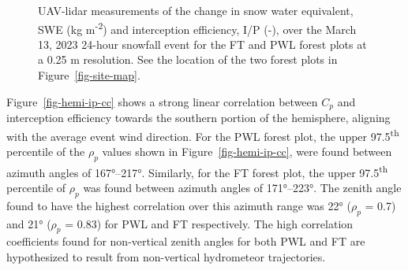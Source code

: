 \documentclass[
  letterpaper,
  DIV=11,
  numbers=noendperiod]{scrartcl}
\begin{document}
\begin{figure}[H]


\caption{\label{fig-lidar-tf-ip}UAV-lidar measurements of the change in
snow water equivalent, SWE (kg m\textsuperscript{-2}) and interception
efficiency, I/P (-), over the March 13, 2023 24-hour snowfall event for
the FT and PWL forest plots at a 0.25 m resolution. See the location of
the two forest plots in Figure~\ref{fig-site-map}.}

\end{figure}%

Figure~\ref{fig-hemi-ip-cc} shows a strong linear correlation between
\(C_p\) and interception efficiency towards the southern portion of the
hemisphere, aligning with the average event wind direction. For the PWL
forest plot, the upper 97.5\textsuperscript{th} percentile of the
\(\rho_p\) values shown in Figure~\ref{fig-hemi-ip-cc}, were found
between azimuth angles of 167°--217°. Similarly, for the FT forest plot,
the upper 97.5\textsuperscript{th} percentile of \(\rho_p\) was found
between azimuth angles of 171°--223°. The zenith angle found to have the
highest correlation over this azimuth range was 22° (\(\rho_p\) = 0.7)
and 21° (\(\rho_p\) = 0.83) for PWL and FT respectively. The high
correlation coefficients found for non-vertical zenith angles for both
PWL and FT are hypothesized to result from non-vertical hydrometeor
trajectories.
\end{document}
